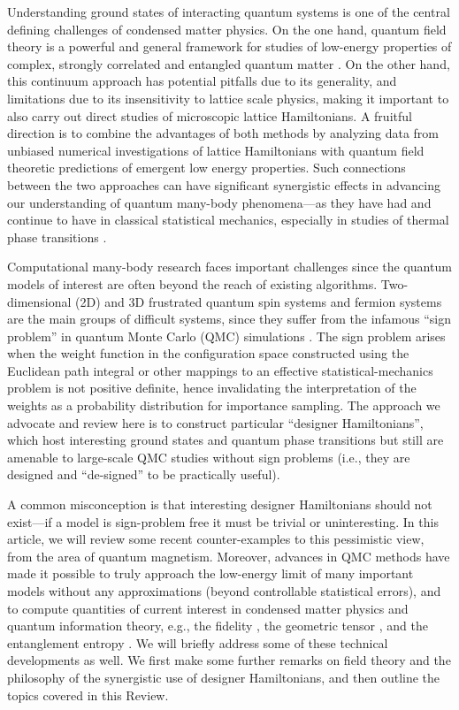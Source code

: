 \documentclass[10pt,pre,aps,twocolumn,showpacs,superscriptaddress,floatfix]{revtex4-1}
\begin{document}
Understanding ground states of interacting quantum systems is one of the central defining challenges of condensed matter physics. On the one
hand, quantum field theory is a powerful and general framework for studies of low-energy properties of complex, strongly correlated and entangled 
quantum matter \cite{Sachdev11}. On the other hand, this continuum approach has potential pitfalls due to its generality, and limitations due to its 
insensitivity to lattice scale physics, making it important to also carry out direct studies of microscopic lattice Hamiltonians. A fruitful direction 
is to combine the advantages of both methods by analyzing data from unbiased numerical investigations of lattice Hamiltonians with quantum field 
theoretic predictions of emergent low energy properties. Such connections between the two approaches can have significant synergistic effects in advancing 
our understanding of quantum many-body phenomena---as they have had and continue to have in classical statistical mechanics, especially in studies 
of thermal phase transitions \cite{cardy1988:fss,Chaikin00}. 

Computational many-body research faces important challenges since the quantum models of interest are often beyond the reach 
of existing algorithms. Two-dimensional (2D) and 3D frustrated quantum spin systems and fermion systems are the main groups 
of difficult systems, since they suffer from the infamous ``sign problem'' in quantum Monte Carlo (QMC) simulations
\cite{Loh90,Henelius00,Nyfeler08}. The sign problem arises when the weight function in the configuration space constructed using the Euclidean path 
integral or other mappings to an effective statistical-mechanics problem is not positive definite, hence invalidating the interpretation of the weights as a probability distribution for importance sampling. The approach we advocate and review here is to construct particular 
``designer Hamiltonians'', which host interesting ground states and quantum phase transitions but still are amenable to 
large-scale QMC studies without sign problems (i.e., they are designed and ``de-signed'' to be practically useful). 

A common misconception is that interesting designer Hamiltonians should not exist---if a model is sign-problem 
free it must be trivial or uninteresting. In this article, we will review some recent counter-examples to this pessimistic view, 
from the area of quantum magnetism. 
Moreover, advances in QMC 
methods \cite{Sandvik91,Evertz93,Beard96,WormA,Sandvik99,Sandvik10a} have made it possible to truly approach the 
low-energy limit of many important models without any approximations (beyond controllable statistical errors), and to compute 
quantities of current interest in condensed matter physics and quantum information theory, e.g., the fidelity 
\cite{Schwandt09}, the geometric tensor \cite{Degrandi11}, and the entanglement entropy \cite{Hastings10, Melko10}. We will 
briefly address some of these technical developments as well. We first make some further remarks on field theory and the philosophy 
of the synergistic use of designer Hamiltonians, and then outline the topics covered in this Review.
\end{document}
